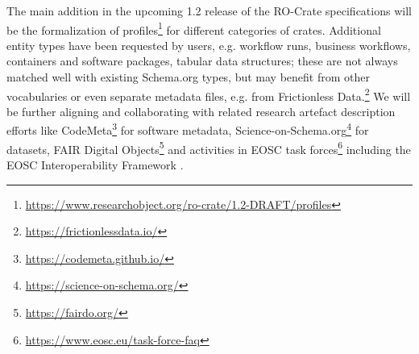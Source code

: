 The main addition in the upcoming 1.2 release of the RO-Crate
specifications will be the formalization of
profiles\footnote{\url{https://www.researchobject.org/ro-crate/1.2-DRAFT/profiles}}
for different categories of crates. Additional entity types have been
requested by users, e.g. workflow runs, business workflows, containers
and software packages, tabular data structures; these are not always
matched well with existing Schema.org types, but may benefit from other
vocabularies or even separate metadata files, e.g. from Frictionless
Data.\footnote{\url{https://frictionlessdata.io/}} We will be further aligning
and collaborating with related research artefact description efforts
like CodeMeta\footnote{\url{https://codemeta.github.io/}} for software metadata,
Science-on-Schema.org\footnote{\url{https://science-on-schema.org/}}
\cite{ch5-66} for datasets, FAIR Digital
Objects\footnote{\url{https://fairdo.org/}} \cite{De Smedt 2020} and
activities in EOSC task forces\footnote{\url{https://www.eosc.eu/task-force-faq}}
including the EOSC Interoperability Framework \cite{eosc-interop-framework}.
